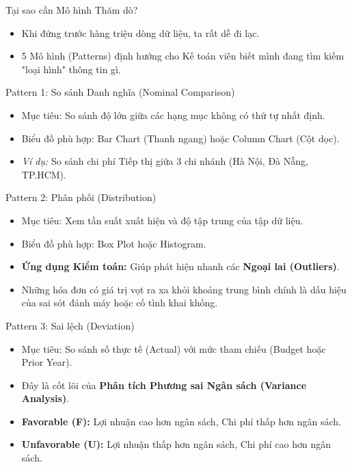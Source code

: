 \documentclass[aspectratio=169,12pt]{beamer}
\begin{document}
\begin{frame}{Tại sao cần Mô hình Thăm dò?}
    \begin{itemize}
        \item Khi đứng trước hàng triệu dòng dữ liệu, ta rất dễ đi lạc.
        \item 5 Mô hình (Patterns) định hướng cho Kế toán viên biết mình đang tìm kiếm "loại hình" thông tin gì.
    \end{itemize}
\end{frame}

\begin{frame}{Pattern 1: So sánh Danh nghĩa (Nominal Comparison)}
    \begin{itemize}
        \item Mục tiêu: So sánh độ lớn giữa các hạng mục không có thứ tự nhất định.
        \item Biểu đồ phù hợp: Bar Chart (Thanh ngang) hoặc Column Chart (Cột dọc).
        \item \textit{Ví dụ:} So sánh chi phí Tiếp thị giữa 3 chi nhánh (Hà Nội, Đà Nẵng, TP.HCM).
    \end{itemize}
\end{frame}

\begin{frame}{Pattern 2: Phân phối (Distribution)}
    \begin{itemize}
        \item Mục tiêu: Xem tần suất xuất hiện và độ tập trung của tập dữ liệu.
        \item Biểu đồ phù hợp: Box Plot hoặc Histogram.
        \item \textbf{Ứng dụng Kiểm toán:} Giúp phát hiện nhanh các \textbf{Ngoại lai (Outliers)}.
        \item Những hóa đơn có giá trị vọt ra xa khỏi khoảng trung bình chính là dấu hiệu của sai sót đánh máy hoặc cố tình khai khống.
    \end{itemize}
\end{frame}

\begin{frame}{Pattern 3: Sai lệch (Deviation)}
    \begin{itemize}
        \item Mục tiêu: So sánh số thực tế (Actual) với mức tham chiếu (Budget hoặc Prior Year).
        \item Đây là cốt lõi của \textbf{Phân tích Phương sai Ngân sách (Variance Analysis)}.
        \item \textbf{Favorable (F):} Lợi nhuận cao hơn ngân sách, Chi phí thấp hơn ngân sách.
        \item \textbf{Unfavorable (U):} Lợi nhuận thấp hơn ngân sách, Chi phí cao hơn ngân sách.
    \end{itemize}
\end{frame}
\end{document}
